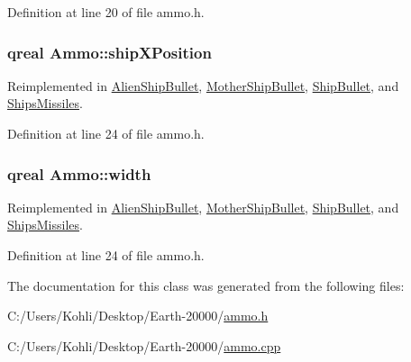 Definition at line 20 of file ammo.h.\hypertarget{class_ammo_a86583f8632ca9604ef0ae839d78fe5ef}{
\subsubsection[{shipXPosition}]{\setlength{\rightskip}{0pt plus 5cm}qreal {\bf Ammo::shipXPosition}}}
\label{class_ammo_a86583f8632ca9604ef0ae839d78fe5ef}


Reimplemented in \hyperlink{class_alien_ship_bullet_a9fd89e42b168c49956e30a8a6f33304e}{AlienShipBullet}, \hyperlink{class_mother_ship_bullet_af8b80672b755f96fa75b0eb4786fc1a0}{MotherShipBullet}, \hyperlink{class_ship_bullet_a3af7e87f7c4e261da57f5fe73c41094f}{ShipBullet}, and \hyperlink{class_ships_missiles_a728619287aa81ab7bcbdbd034d1c3c8a}{ShipsMissiles}.

Definition at line 24 of file ammo.h.\hypertarget{class_ammo_aad7996f9abdcb6ade7e67f7c7f5e5ebe}{
\subsubsection[{width}]{\setlength{\rightskip}{0pt plus 5cm}qreal {\bf Ammo::width}}}
\label{class_ammo_aad7996f9abdcb6ade7e67f7c7f5e5ebe}


Reimplemented in \hyperlink{class_alien_ship_bullet_a08bb3094350eab416509120e76987df5}{AlienShipBullet}, \hyperlink{class_mother_ship_bullet_ab81cbaea7101d4c9f8ac0c0fbba5fe8a}{MotherShipBullet}, \hyperlink{class_ship_bullet_a13d7785c8b0cb473a16fa5c9e82f3911}{ShipBullet}, and \hyperlink{class_ships_missiles_a335b53cf15200f696ba3c8cdd9b38d85}{ShipsMissiles}.

Definition at line 24 of file ammo.h.

The documentation for this class was generated from the following files:\begin{DoxyCompactItemize}
\item 
C:/Users/Kohli/Desktop/Earth-\/20000/\hyperlink{ammo_8h}{ammo.h}\item 
C:/Users/Kohli/Desktop/Earth-\/20000/\hyperlink{ammo_8cpp}{ammo.cpp}\end{DoxyCompactItemize}
